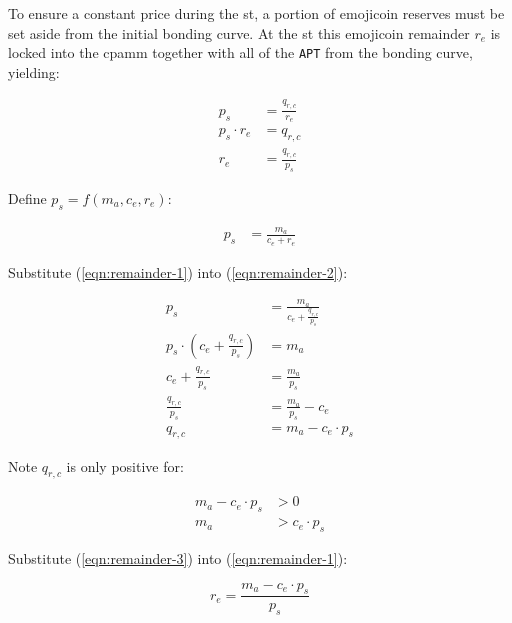 \documentclass[table, twocolumn]{article}
\begin{document}
To ensure a constant price during the \gls*{st}, a portion of emojicoin reserves must be
set aside from the initial bonding curve. At the \gls*{st} this emojicoin remainder
$r_e$ is locked into the \gls*{cpamm} together with all of the \texttt{APT} from the
bonding curve, yielding:

\begin{align} \label{eqn:remainder-1}
  p_s           & = \frac{q_{r, c}}{r_e} \nonumber \\
  p_s \cdot r_e & = q_{r, c} \nonumber             \\
  r_e           & = \frac{q_{r, c}}{p_s}
\end{align}

Define $p_s = f(m_a, c_e, r_e)$:

\begin{align} \label{eqn:remainder-2}
  p_s & = \frac{m_a}{c_e + r_e}
\end{align}

Substitute (\ref{eqn:remainder-1}) into (\ref{eqn:remainder-2}):

\begin{align} \label{eqn:remainder-3}
  p_s                                                & =
  \frac{m_a}{c_e + \frac{q_{r, c}}{p_s}} \nonumber                                 \\
  p_s \cdot \left(c_e + \frac{q_{r, c}}{p_s} \right) & = m_a \nonumber             \\
  c_e + \frac{q_{r, c}}{p_s}                         & = \frac{m_a}{p_s} \nonumber \\
  \frac{q_{r, c}}{p_s}                               & =
  \frac{m_a}{p_s} - c_e \nonumber                                                  \\
  q_{r, c}                                           & = m_a - c_e \cdot p_s
\end{align}

Note $q_{r, c}$ is only positive for:

\begin{align} \label{eqn:remainder-4}
  m_a - c_e \cdot p_s & > 0 \nonumber   \\
  m_a                 & > c_e \cdot p_s
\end{align}

Substitute (\ref{eqn:remainder-3}) into (\ref{eqn:remainder-1}):

\begin{equation} \label{eqn:remainder-5}
  r_e = \frac{m_a - c_e \cdot p_s}{p_s}
\end{equation}
\end{document}
